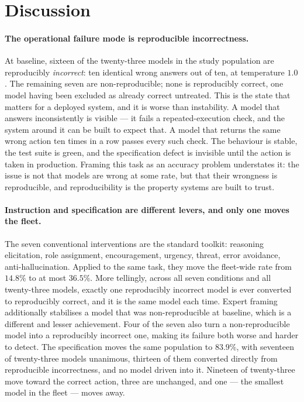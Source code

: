 \section{Discussion}
\label{sec:discussion}

\paragraph{The operational failure mode is reproducible incorrectness.}
At baseline, sixteen of the twenty-three models in the study population are
reproducibly \emph{incorrect}: ten identical wrong answers out of ten, at
temperature $1.0$. The remaining seven are non-reproducible; none is reproducibly
correct, one model having been excluded as already correct untreated. This is the state that matters for a deployed system, and it is
worse than instability. A model that answers inconsistently is visible --- it fails
a repeated-execution check, and the system around it can be built to expect that.
A model that returns the same wrong action ten times in a row passes every such
check. The behaviour is stable, the test suite is green, and the specification
defect is invisible until the action is taken in production. Framing this task as
an accuracy problem understates it: the issue is not that models are wrong at some
rate, but that their wrongness is reproducible, and reproducibility is the property
systems are built to trust.

\paragraph{Instruction and specification are different levers, and only one moves the fleet.}
The seven conventional interventions are the standard toolkit: reasoning
elicitation, role assignment, encouragement, urgency, threat, error avoidance,
anti-hallucination. Applied to the same task, they move the fleet-wide rate from
$14.8\%$ to at most $36.5\%$. More tellingly, across all seven conditions and all
twenty-three models, exactly one reproducibly incorrect model is ever converted to
reproducibly correct, and it is the same model each time. Expert framing
additionally stabilises a model that was non-reproducible at baseline, which is a
different and lesser achievement. Four of the seven also turn a non-reproducible model into a reproducibly incorrect
one, making its failure both worse and harder to detect. The specification moves the
same population to $83.9\%$, with seventeen of twenty-three models unanimous,
thirteen of them converted directly from reproducible incorrectness, and no model
driven into it. Nineteen of twenty-three move toward
the correct action, three are unchanged, and one --- the smallest model in the
fleet --- moves away.

